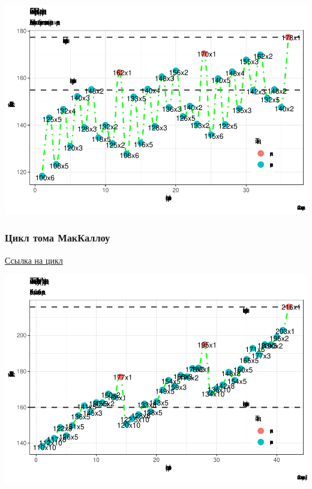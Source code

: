 \documentclass[
]{article}
\begin{document}
\begin{center}\includegraphics[width=0.95\linewidth]{Regression-model-for-estimating-RM_files/figure-latex/unnamed-chunk-58-2} \end{center}

\hypertarget{ux446ux438ux43aux43b-ux442ux43eux43cux430-ux43cux430ux43aux43aux430ux43bux43bux43eux443}{%
\subsubsection{Цикл тома
МакКаллоу}\label{ux446ux438ux43aux43b-ux442ux43eux43cux430-ux43cux430ux43aux43aux430ux43bux43bux43eux443}}

\href{https://github.com/PasaOpasen/Powerlifting-training-diary-and-articles/blob/master/Материалы\%20по\%20пауэрлифтингу\%20и\%20не\%20только/циклы/Tyagovy-tsikl-Toma-Makkelou.xls}{Ссылка
на цикл}

\begin{center}\includegraphics[width=0.95\linewidth]{Regression-model-for-estimating-RM_files/figure-latex/unnamed-chunk-59-1} \end{center}
\end{document}
